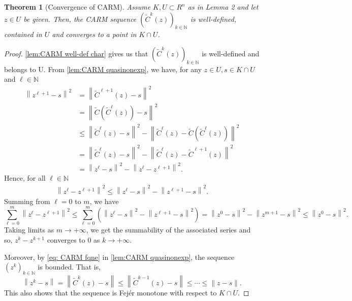 \documentclass[smallextended,numbook,nospthms]{svjour3}
\theoremstyle{plain}
\newtheorem{theorem}{Theorem}[subsection]
\theoremstyle{definition}
\def\NN{\mathds N}
\begin{document}
\begin{theorem}[Convergence of CARM]\label{thm:CARM conv}
	Assume $K, U \subset R^{n}$ as in Lemma 2 and let $z \in U$ be given. Then, the CARM sequence $\left(\tilde{C}^{k}(z)\right)_{k \in \NN}$ is well-defined, contained in $U$ and converges to a point in $K \cap U$.
\end{theorem}
\begin{proof}
	 \cref{lem:CARM well-def char} gives us that $\left(\tilde{C}^{k}(z)\right)_{k \in \NN}$ is well-defined and belongs to U.
	From  \cref{lem:CARM quasinonexp}, we have, for any $z \in U, s \in K \cap U$ and $\ell \in \NN$
	\begin{align}
		\left\|z^{\ell+1}-s\right\|^{2} &=\left\|\tilde{C}^{\ell+1}(z)-s\right\|^{2} \\
		&=\left\|\tilde{C}\left(\tilde{C}^{\ell}(z)\right)-s\right\|^{2} \\
		& \leq\left\|\tilde{C}^{\ell}(z)-s\right\|^{2}-\left\|\tilde{C}^{\ell}(z)-\tilde{C}\left(\tilde{C}^{\ell}(z)\right)\right\|^{2} \\
		&=\left\|\tilde{C}^{\ell}(z)-s\right\|^{2}-\left\|\tilde{C}^{\ell}(z)-\tilde{C}^{\ell+1}(z)\right\|^{2} \\
		&=\left\|z^{\ell}-s\right\|^{2}-\left\|z^{\ell}-z^{\ell+1}\right\|^{2}.
	\end{align}
	Hence, for all $\ell \in \NN$
	\begin{align}
		\left\|z^{\ell}-z^{\ell+1}\right\|^{2} \leq\left\|z^{\ell}-s\right\|^{2}-\left\|z^{\ell+1}-s\right\|^{2}.
	\end{align} 
	Summing from $\ell=0$ to $m$, we have
	\begin{equation}
		\sum_{\ell=0}^{m}\left\|z^{\ell}-z^{\ell+1}\right\|^{2} \leq \sum_{\ell=0}^{m}\left(\left\|z^{\ell}-s\right\|^{2}-\left\|z^{\ell+1}-s\right\|^{2}\right)=\left\|z^{0}-s\right\|^{2}-\left\|z^{m+1}-s\right\|^{2} \leq\left\|z^{0}-s\right\|^{2}.
	\end{equation}
	Taking limits as $m \rightarrow+\infty$, we get the summability of the associated series and so, $z^{k}-z^{k+1}$ converges to 0 as $k \rightarrow+\infty$.
	
	Moreover, by \cref{eq: CARM fqne} in  \cref{lem:CARM quasinonexp}, the sequence $\left(z^{k}\right)_{k \in \NN}$ is bounded. That is,
	\begin{equation}
		\left\|z^{k}-s\right\| = \left\|\tilde{C}^{k}(z)-s\right\| \leq\left\|\tilde{C}^{k-1}(z)-s\right\| \leq \cdots \leq\|z-s\|.
	\end{equation}
	This also shows that the sequence is Fejér monotone with respect to $K \cap U$.
	

\end{proof}
\end{document}
